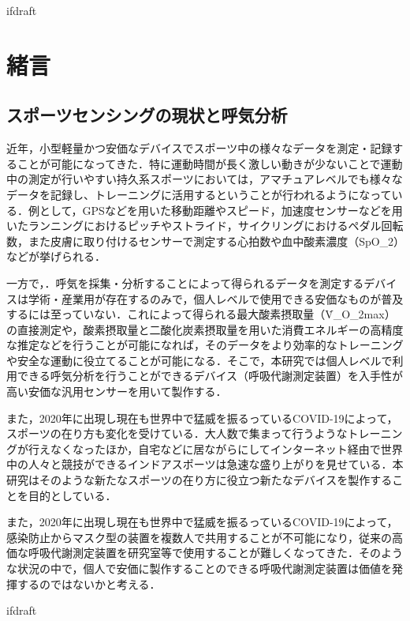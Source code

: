 \expandafter\ifx\csname ifdraft\endcsname\relax
 
\fi

\section{緒言}

\subsection{スポーツセンシングの現状と呼気分析}

近年，小型軽量かつ安価なデバイスでスポーツ中の様々なデータを測定・記録することが可能になってきた．特に運動時間が長く激しい動きが少ないことで運動中の測定が行いやすい持久系スポーツにおいては，アマチュアレベルでも様々なデータを記録し、トレーニングに活用するということが行われるようになっている．例として，GPSなどを用いた移動距離やスピード，加速度センサーなどを用いたランニングにおけるピッチやストライド，サイクリングにおけるペダル回転数，また皮膚に取り付けるセンサーで測定する心拍数や血中酸素濃度（SpO_2）などが挙げられる．

一方で，．呼気を採集・分析することによって得られるデータを測定するデバイスは学術・産業用が存在するのみで，個人レベルで使用できる安価なものが普及するには至っていない．これによって得られる最大酸素摂取量（\.{V}_{O_2max}）の直接測定や，酸素摂取量と二酸化炭素摂取量を用いた消費エネルギーの高精度な推定などを行うことが可能になれば，そのデータをより効率的なトレーニングや安全な運動に役立てることが可能になる．そこで，本研究では個人レベルで利用できる呼気分析を行うことができるデバイス（呼吸代謝測定装置）を入手性が高い安価な汎用センサーを用いて製作する．

また，2020年に出現し現在も世界中で猛威を振るっているCOVID-19によって，スポーツの在り方も変化を受けている．大人数で集まって行うようなトレーニングが行えなくなったほか，自宅などに居ながらにしてインターネット経由で世界中の人々と競技ができるインドアスポーツは急速な盛り上がりを見せている．本研究はそのような新たなスポーツの在り方に役立つ新たなデバイスを製作することを目的としている．

また，2020年に出現し現在も世界中で猛威を振るっているCOVID-19によって，感染防止からマスク型の装置を複数人で共用することが不可能になり，従来の高価な呼吸代謝測定装置を研究室等で使用することが難しくなってきた．そのような状況の中で，個人で安価に製作することのできる呼吸代謝測定装置は価値を発揮するのではないかと考える．

\expandafter\ifx\csname ifdraft\endcsname\relax
  
\fi
